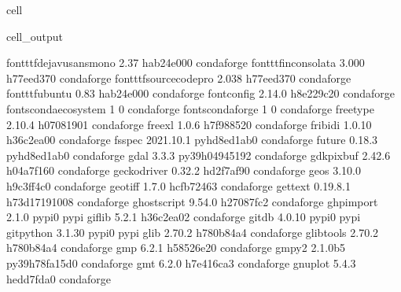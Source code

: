 \documentclass[letterpaper,table,10pt,english]{jupyterBook}
\begin{document}
\begin{sphinxuseclass}{cell}
\begin{sphinxVerbatimOutput}
\begin{sphinxuseclass}{cell_output}
\begin{sphinxVerbatim}[commandchars=\\\{\}]
font\PYGZhy{}ttf\PYGZhy{}dejavu\PYGZhy{}sans\PYGZhy{}mono 2.37                 hab24e00\PYGZus{}0    conda\PYGZhy{}forge
font\PYGZhy{}ttf\PYGZhy{}inconsolata      3.000                h77eed37\PYGZus{}0    conda\PYGZhy{}forge
font\PYGZhy{}ttf\PYGZhy{}source\PYGZhy{}code\PYGZhy{}pro  2.038                h77eed37\PYGZus{}0    conda\PYGZhy{}forge
font\PYGZhy{}ttf\PYGZhy{}ubuntu           0.83                 hab24e00\PYGZus{}0    conda\PYGZhy{}forge
fontconfig                2.14.0               h8e229c2\PYGZus{}0    conda\PYGZhy{}forge
fonts\PYGZhy{}conda\PYGZhy{}ecosystem     1                             0    conda\PYGZhy{}forge
fonts\PYGZhy{}conda\PYGZhy{}forge         1                             0    conda\PYGZhy{}forge
freetype                  2.10.4               h0708190\PYGZus{}1    conda\PYGZhy{}forge
freexl                    1.0.6                h7f98852\PYGZus{}0    conda\PYGZhy{}forge
fribidi                   1.0.10               h36c2ea0\PYGZus{}0    conda\PYGZhy{}forge
fsspec                    2021.10.1          pyhd8ed1ab\PYGZus{}0    conda\PYGZhy{}forge
future                    0.18.3             pyhd8ed1ab\PYGZus{}0    conda\PYGZhy{}forge
gdal                      3.3.3            py39h0494519\PYGZus{}2    conda\PYGZhy{}forge
gdk\PYGZhy{}pixbuf                2.42.6               h04a7f16\PYGZus{}0    conda\PYGZhy{}forge
geckodriver               0.32.2               hd2f7af9\PYGZus{}0    conda\PYGZhy{}forge
geos                      3.10.0               h9c3ff4c\PYGZus{}0    conda\PYGZhy{}forge
geotiff                   1.7.0                hcfb7246\PYGZus{}3    conda\PYGZhy{}forge
gettext                   0.19.8.1          h73d1719\PYGZus{}1008    conda\PYGZhy{}forge
ghostscript               9.54.0               h27087fc\PYGZus{}2    conda\PYGZhy{}forge
ghp\PYGZhy{}import                2.1.0                    pypi\PYGZus{}0    pypi
giflib                    5.2.1                h36c2ea0\PYGZus{}2    conda\PYGZhy{}forge
gitdb                     4.0.10                   pypi\PYGZus{}0    pypi
gitpython                 3.1.30                   pypi\PYGZus{}0    pypi
glib                      2.70.2               h780b84a\PYGZus{}4    conda\PYGZhy{}forge
glib\PYGZhy{}tools                2.70.2               h780b84a\PYGZus{}4    conda\PYGZhy{}forge
gmp                       6.2.1                h58526e2\PYGZus{}0    conda\PYGZhy{}forge
gmpy2                     2.1.0b5          py39h78fa15d\PYGZus{}0    conda\PYGZhy{}forge
gmt                       6.2.0                h7e416ca\PYGZus{}3    conda\PYGZhy{}forge
gnuplot                   5.4.3                hedd7fda\PYGZus{}0    conda\PYGZhy{}forge

\end{sphinxVerbatim}
\end{sphinxuseclass}
\end{sphinxVerbatimOutput}
\end{sphinxuseclass}
\end{document}
